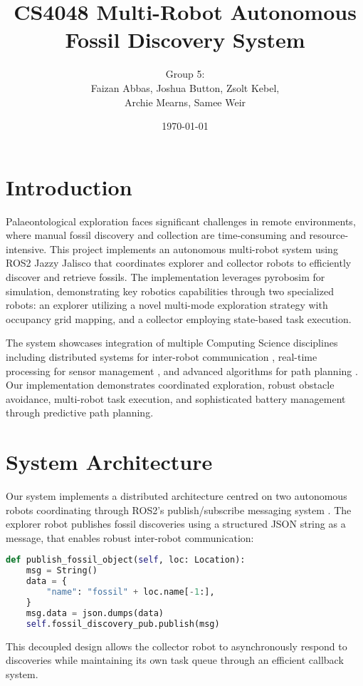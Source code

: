 \documentclass{csfourzero}
\title{CS4048 Multi-Robot Autonomous Fossil Discovery System}
\author{Group 5: \\Faizan Abbas, Joshua Button, Zsolt Kebel, \\Archie Mearns, Samee Weir}
\date{\today}
\begin{document}
\maketitle
\tableofcontents

\newpage
\thispagestyle{empty}

\newpage

\section{Introduction}
\label{sec:intro}
Palaeontological exploration faces significant challenges in remote environments, where manual fossil discovery and collection are time-consuming and resource-intensive. This project implements an autonomous multi-robot system using ROS2 Jazzy Jalisco \cite{ros-docs} that coordinates explorer and collector robots to efficiently discover and retrieve fossils. The implementation leverages pyrobosim \cite{pyrobosim-docs} for simulation, demonstrating key robotics capabilities through two specialized robots: an explorer utilizing a novel multi-mode exploration strategy with occupancy grid mapping, and a collector employing state-based task execution.

The system showcases integration of multiple Computing Science disciplines including distributed systems for inter-robot communication \cite{burgard2002coordinated}, real-time processing for sensor management \cite{Khatib1986}, and advanced algorithms for path planning \cite{LaValle1998}. Our implementation demonstrates coordinated exploration, robust obstacle avoidance, multi-robot task execution, and sophisticated battery management through predictive path planning.


\section{System Architecture}

Our system implements a distributed architecture centred on two autonomous robots coordinating through ROS2's publish/subscribe messaging system \cite{quigley2009ros, marder2010ros}. The explorer robot publishes fossil discoveries using a structured JSON string as a message, that enables robust inter-robot communication:
\begin{lstlisting}[language=Python]
def publish_fossil_object(self, loc: Location):
    msg = String()
    data = {
        "name": "fossil" + loc.name[-1:],
    }
    msg.data = json.dumps(data)
    self.fossil_discovery_pub.publish(msg)
\end{lstlisting}
This decoupled design allows the collector robot to asynchronously respond to discoveries while maintaining its own task queue through an efficient callback system.
\end{document}
